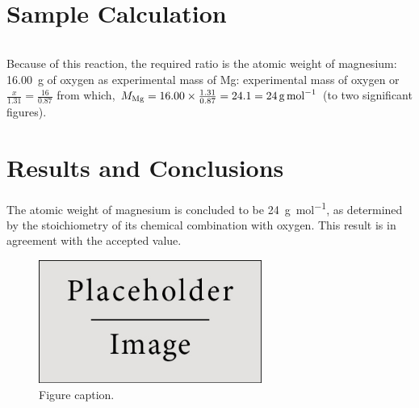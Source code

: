 \documentclass{article}
\begin{document}

\section{Sample Calculation}

\begin{tabular}{ll}
\end{tabular}

Because of this reaction, the required ratio is the atomic weight of magnesium: \SI{16.00}{\gram} of oxygen as experimental mass of Mg: experimental mass of oxygen or $\frac{x}{1.31}=\frac{16}{0.87}$ from which, $M_{\ce{Mg}} = 16.00 \times \frac{1.31}{0.87} = 24.1 = \SI{24}{\gram\per\mole}$ (to two significant figures).


\section{Results and Conclusions}

The atomic weight of magnesium is concluded to be \SI{24}{\gram\per\mol}, as determined by the stoichiometry of its chemical combination with oxygen. This result is in agreement with the accepted value.

\begin{figure}[h]
\begin{center}
\includegraphics[width=0.65\textwidth]{placeholder} %
\caption{Figure caption.}
\end{center}
\end{figure}
\end{document}
